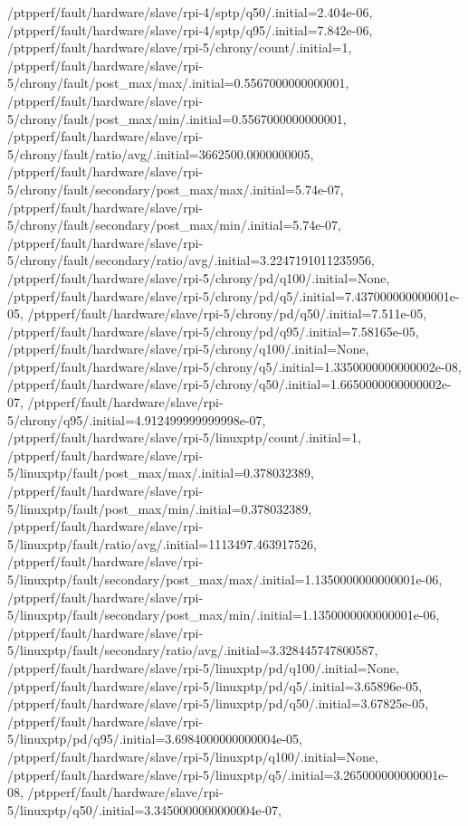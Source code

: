 {    /ptpperf/fault/hardware/slave/rpi-4/sptp/q50/.initial=2.404e-06,
    /ptpperf/fault/hardware/slave/rpi-4/sptp/q95/.initial=7.842e-06,
    /ptpperf/fault/hardware/slave/rpi-5/chrony/count/.initial=1,
    /ptpperf/fault/hardware/slave/rpi-5/chrony/fault/post_max/max/.initial=0.5567000000000001,
    /ptpperf/fault/hardware/slave/rpi-5/chrony/fault/post_max/min/.initial=0.5567000000000001,
    /ptpperf/fault/hardware/slave/rpi-5/chrony/fault/ratio/avg/.initial=3662500.0000000005,
    /ptpperf/fault/hardware/slave/rpi-5/chrony/fault/secondary/post_max/max/.initial=5.74e-07,
    /ptpperf/fault/hardware/slave/rpi-5/chrony/fault/secondary/post_max/min/.initial=5.74e-07,
    /ptpperf/fault/hardware/slave/rpi-5/chrony/fault/secondary/ratio/avg/.initial=3.2247191011235956,
    /ptpperf/fault/hardware/slave/rpi-5/chrony/pd/q100/.initial=None,
    /ptpperf/fault/hardware/slave/rpi-5/chrony/pd/q5/.initial=7.437000000000001e-05,
    /ptpperf/fault/hardware/slave/rpi-5/chrony/pd/q50/.initial=7.511e-05,
    /ptpperf/fault/hardware/slave/rpi-5/chrony/pd/q95/.initial=7.58165e-05,
    /ptpperf/fault/hardware/slave/rpi-5/chrony/q100/.initial=None,
    /ptpperf/fault/hardware/slave/rpi-5/chrony/q5/.initial=1.3350000000000002e-08,
    /ptpperf/fault/hardware/slave/rpi-5/chrony/q50/.initial=1.6650000000000002e-07,
    /ptpperf/fault/hardware/slave/rpi-5/chrony/q95/.initial=4.912499999999998e-07,
    /ptpperf/fault/hardware/slave/rpi-5/linuxptp/count/.initial=1,
    /ptpperf/fault/hardware/slave/rpi-5/linuxptp/fault/post_max/max/.initial=0.378032389,
    /ptpperf/fault/hardware/slave/rpi-5/linuxptp/fault/post_max/min/.initial=0.378032389,
    /ptpperf/fault/hardware/slave/rpi-5/linuxptp/fault/ratio/avg/.initial=1113497.463917526,
    /ptpperf/fault/hardware/slave/rpi-5/linuxptp/fault/secondary/post_max/max/.initial=1.1350000000000001e-06,
    /ptpperf/fault/hardware/slave/rpi-5/linuxptp/fault/secondary/post_max/min/.initial=1.1350000000000001e-06,
    /ptpperf/fault/hardware/slave/rpi-5/linuxptp/fault/secondary/ratio/avg/.initial=3.328445747800587,
    /ptpperf/fault/hardware/slave/rpi-5/linuxptp/pd/q100/.initial=None,
    /ptpperf/fault/hardware/slave/rpi-5/linuxptp/pd/q5/.initial=3.65896e-05,
    /ptpperf/fault/hardware/slave/rpi-5/linuxptp/pd/q50/.initial=3.67825e-05,
    /ptpperf/fault/hardware/slave/rpi-5/linuxptp/pd/q95/.initial=3.6984000000000004e-05,
    /ptpperf/fault/hardware/slave/rpi-5/linuxptp/q100/.initial=None,
    /ptpperf/fault/hardware/slave/rpi-5/linuxptp/q5/.initial=3.265000000000001e-08,
    /ptpperf/fault/hardware/slave/rpi-5/linuxptp/q50/.initial=3.3450000000000004e-07,
}

